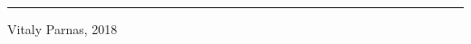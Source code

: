 \documentclass[11pt]{article} %
\begin{document}
\begin{multicols}{3}

\rule{1.0\linewidth}{0.25pt}
\scriptsize

Vitaly Parnas, 2018

\end{multicols}
\end{document}
